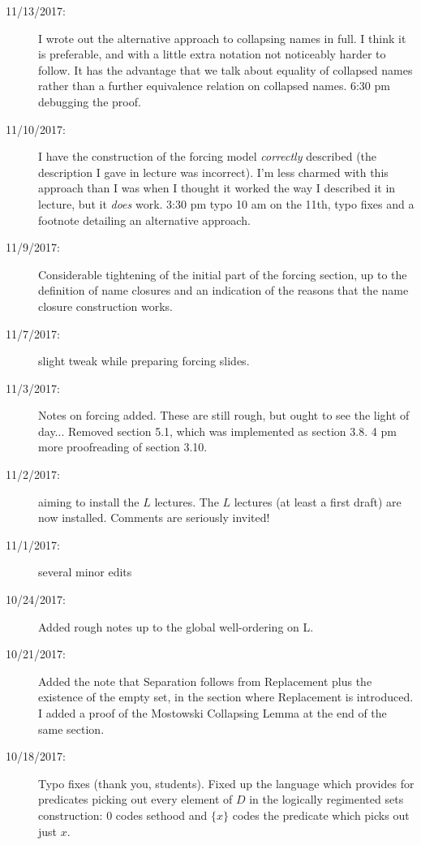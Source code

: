 \documentclass[12pt]{book}
\begin{document}
{\begin{description}
\item[11/13/2017:]  I wrote out the alternative approach to collapsing names in full.  I think it is preferable, and with a little extra notation not noticeably harder to follow.  It has the advantage that we talk about equality of collapsed names rather than a further equivalence relation on collapsed names.  6:30 pm debugging the  proof.

\item[11/10/2017:]  I have the construction of the forcing model {\em correctly\/} described (the description I gave in lecture was incorrect).  I'm less charmed with this approach than I was when I thought it worked the way I described it in lecture, but it {\em does\/} work.  3:30 pm typo  10 am on the 11th, typo fixes and a footnote detailing an alternative approach.

\item[11/9/2017:]  Considerable tightening of the initial part of the forcing section, up to the definition of name closures and an indication of the reasons that the name closure construction works.

\item[11/7/2017:]  slight tweak while preparing forcing slides.

\item[11/3/2017:]  Notes on forcing added.  These are still rough, but ought to see the light of day...  Removed section 5.1, which was implemented as section 3.8. 4 pm more proofreading of section 3.10.

\item[11/2/2017:]  aiming to install the $L$ lectures.  The $L$ lectures (at least a first draft) are now installed.  Comments are seriously invited!

\item[11/1/2017:]  several minor edits

\item[10/24/2017:]  Added rough notes up to the global well-ordering on L.

\item[10/21/2017:]  Added the note that Separation follows from Replacement plus the existence of the empty set, in the section where Replacement is introduced.  I added a proof of the Mostowski Collapsing Lemma at the end of the same section.

\item[10/18/2017:]  Typo fixes (thank you, students).  Fixed up the language which provides for predicates picking out every element of $D$ in the logically regimented sets construction:  0 codes sethood and $\{x\}$ codes the predicate which picks out just $x$.


\end{description}}
\end{document}
